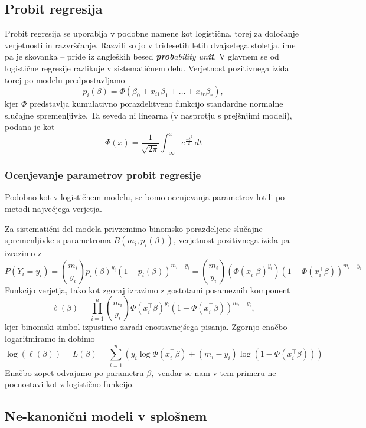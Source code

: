 \documentclass[12pt,a4paper]{amsart}
\theoremstyle{definition} %
\theoremstyle{plain} %
\begin{document}
\subsection{Probit regresija}
Probit regresija se uporablja v podobne namene kot logistična, torej za določanje verjetnosti in razvrščanje. Razvili so jo v tridesetih letih
dvajsetega stoletja, ime pa je skovanka -- pride iz angleških besed \textit{\textbf{prob}ability un\textbf{it}}. V glavnem se od logistične regresije
razlikuje v sistematičnem delu. Verjetnost pozitivnega izida torej po modelu predpostavljamo
\begin{equation}
    p_{i}(\beta) = \Phi (\beta_{0} + x_{i1}\beta_{1} + \ldots + x_{ir}\beta_{r}),
\end{equation}
kjer $\Phi$ predstavlja kumulativno porazdelitveno funkcijo standardne normalne slučajne spremenljivke. Ta seveda ni linearna (v nasprotju s prejšnjimi modeli),
podana je kot 
\[
    \Phi(x) = \frac{1}{\sqrt{2\pi}}\int_{-\infty}^{x}e^{\frac{-t^2}{2}}\,dt
\]

\subsubsection{Ocenjevanje parametrov probit regresije}
Podobno kot v logističnem modelu, se bomo ocenjevanja parametrov lotili po metodi največjega verjetja. 

Za sistematični del modela privzemimo binomsko porazdeljene slučajne spremenljivke s parametroma $B(m_{i},p_{i}(\beta))$,
verjetnost pozitivnega izida pa izrazimo z
\[
    P(Y_{i} = y_{i}) = \binom{m_{i}}{y_{i}}p_{i}(\beta)^{y_{i}}(1 - p_{i}(\beta))^{m_{i} - y_{i}} = \binom{m_{i}}{y_{i}} (\Phi(x_{i}^\top \beta)^{y_{i}})(1 - \Phi(x_{i}^\top \beta))^{m_{i} - y_{i}} 
\]
Funkcijo verjetja, tako kot zgoraj izrazimo z gostotami posameznih komponent
\[
    \ell(\beta) = \prod_{i=1}^{n} \binom{m_{i}}{y_{i}} \Phi(x_{i}^\top\beta)^{y_{i}}(1 - \Phi(x_{i}^\top\beta))^{m_{i} - y_{i}},
\]
kjer binomski simbol izpustimo zaradi enostavnejšega pisanja. Zgornjo enačbo logaritmiramo in dobimo
\begin{equation}
    \log(\ell(\beta)) = L(\beta) = \sum_{i = 1}^{n}\left(y_{i}\log\Phi(x_{i}^\top\beta) + (m_{i} - y_{i})\log(1 - \Phi(x_{i}^\top\beta)) \right)
\end{equation}
Enačbo zopet odvajamo po parametru $\beta,$ vendar se nam v tem primeru ne poenostavi kot z logistično funkcijo.

\subsection{Ne-kanonični modeli v splošnem}
\end{document}
